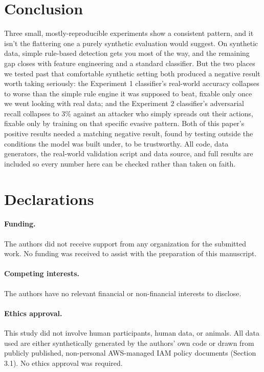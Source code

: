 \documentclass[11pt,a4paper]{article}
\begin{document}
\section{Conclusion}

Three small, mostly-reproducible experiments show a consistent pattern, and it isn't the flattering one a purely synthetic evaluation would suggest. On synthetic data, simple rule-based detection gets you most of the way, and the remaining gap closes with feature engineering and a standard classifier. But the two places we tested past that comfortable synthetic setting both produced a negative result worth taking seriously: the Experiment 1 classifier's real-world accuracy collapses to worse than the simple rule engine it was supposed to beat, fixable only once we went looking with real data; and the Experiment 2 classifier's adversarial recall collapses to 3\% against an attacker who simply spreads out their actions, fixable only by training on that specific evasive pattern. Both of this paper's positive results needed a matching negative result, found by testing outside the conditions the model was built under, to be trustworthy. All code, data generators, the real-world validation script and data source, and full results are included so every number here can be checked rather than taken on faith.

\section*{Declarations}

\paragraph{Funding.} The authors did not receive support from any organization for the submitted work. No funding was received to assist with the preparation of this manuscript.

\paragraph{Competing interests.} The authors have no relevant financial or non-financial interests to disclose.

\paragraph{Ethics approval.} This study did not involve human participants, human data, or animals. All data used are either synthetically generated by the authors' own code or drawn from publicly published, non-personal AWS-managed IAM policy documents (Section 3.1). No ethics approval was required.
\end{document}
